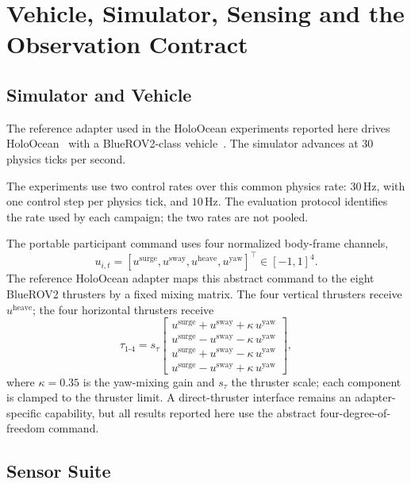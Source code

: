 \section{Vehicle, Simulator, Sensing and the Observation Contract}
\label{sec:configuration}

\subsection{Simulator and Vehicle}

The reference adapter used in the HoloOcean experiments reported here drives
HoloOcean~\cite{potokar2024holoocean} with a BlueROV2-class
vehicle~\cite{vonbenzon2022bluerov2}. The simulator advances at $30$ physics
ticks per second.

The experiments use two control rates over this common physics rate: $30$\,Hz,
with one control step per physics tick, and $10$\,Hz. The evaluation protocol
identifies the rate used by each campaign; the two rates are not pooled.

The portable participant command uses four normalized body-frame channels,
\begin{equation}
\label{eq:command}
u_{i,t}=
\left[
u^{\mathrm{surge}},
u^{\mathrm{sway}},
u^{\mathrm{heave}},
u^{\mathrm{yaw}}
\right]^{\top}
\in[-1,1]^4 .
\end{equation}
The reference HoloOcean adapter maps this abstract command to the eight
BlueROV2 thrusters by a fixed mixing matrix. The four vertical thrusters receive
$u^{\mathrm{heave}}$; the four horizontal thrusters receive
\begin{equation}
\label{eq:thruster_mix}
\tau_{1\text{-}4}= s_\tau\!\begin{bmatrix} u^{\mathrm{surge}}+u^{\mathrm{sway}}+\kappa\,u^{\mathrm{yaw}} \\[1pt] u^{\mathrm{surge}}-u^{\mathrm{sway}}-\kappa\,u^{\mathrm{yaw}} \\[1pt] u^{\mathrm{surge}}+u^{\mathrm{sway}}-\kappa\,u^{\mathrm{yaw}} \\[1pt] u^{\mathrm{surge}}-u^{\mathrm{sway}}+\kappa\,u^{\mathrm{yaw}} \end{bmatrix},
\end{equation}
where $\kappa=0.35$ is the yaw-mixing gain and $s_\tau$ the thruster scale; each
component is clamped to the thruster limit. A direct-thruster interface remains
an adapter-specific capability, but all results reported here use the abstract
four-degree-of-freedom command.

\subsection{Sensor Suite}

